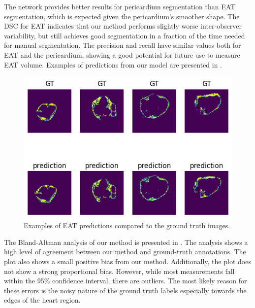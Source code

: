 The network provides better results for pericardium segmentation than EAT segmentation, which is expected given the pericardium's smoother shape. The DSC for EAT indicates that our method performs slightly worse inter-observer variability, but still achieves good segmentation in a fraction of the time needed for manual segmentation. The precision and recall have similar values both for EAT and the pericardium, showing a good potential for future use to measure EAT volume. Examples of predictions from our model are presented in .

\begin{figure}[h]
    \centering
    \includegraphics[width=\columnwidth]{images/6/examples.png}
    \caption{Examples of EAT predictions compared to the ground truth images. \cite{bencevicEpicardialAdiposeTissue2021}}
    \label{fig:examples}
\end{figure}

The Bland-Altman analysis of our method is presented in . The analysis shows a high level of agreement between our method and ground-truth annotations. The plot also shows a small positive bias from our method. Additionally, the plot does not show a strong proportional bias. However, while most measurements fall within the 95\% confidence interval, there are outliers. The most likely reason for these errors is the noisy nature of the ground truth labels especially towards the edges of the heart region.

